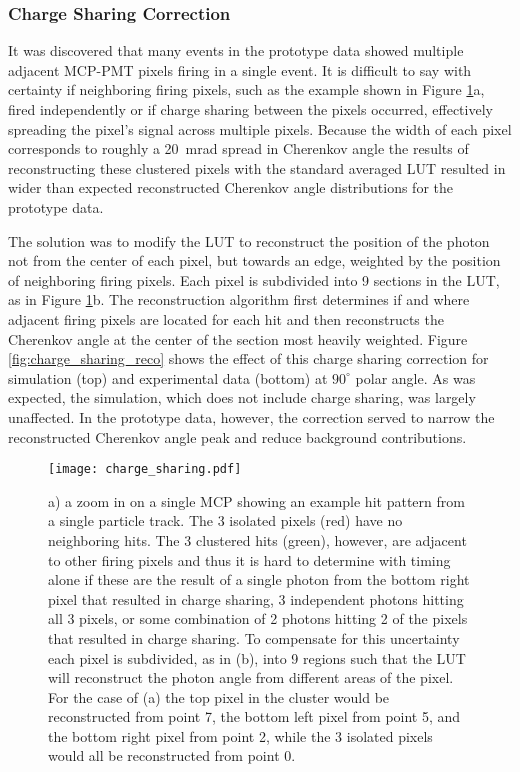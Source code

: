 \subsubsection{Charge Sharing Correction}
It was discovered that many events in the prototype data showed multiple adjacent MCP-PMT pixels firing in a single event. It is difficult to say with certainty if neighboring firing pixels, such as the example shown in Figure \ref{fig:charge_sharing}a, fired independently or if charge sharing between the pixels occurred, effectively spreading the pixel's signal across multiple pixels. Because the width of each pixel corresponds to roughly a 20~mrad spread in Cherenkov angle the results of reconstructing these clustered pixels with the standard averaged LUT resulted in wider than expected reconstructed Cherenkov angle distributions for the prototype data. 

The solution was to modify the LUT to reconstruct the position of the photon not from the center of each pixel, but towards an edge, weighted by the position of neighboring firing pixels. Each pixel is subdivided into 9 sections in the LUT, as in Figure \ref{fig:charge_sharing}b. The reconstruction algorithm first determines if and where adjacent firing pixels are located for each hit and then reconstructs the Cherenkov angle at the center of the section most heavily weighted. Figure \ref{fig:charge_sharing_reco} shows the effect of this charge sharing correction for simulation (top) and experimental data (bottom) at $90^\circ$ polar angle. As was expected, the simulation, which does not include charge sharing, was largely unaffected. In the prototype data, however, the correction served to narrow the reconstructed Cherenkov angle peak and reduce background contributions.

\begin{figure}[!htb]
	\centering
	\texttt{[image: charge\_sharing.pdf]}
	\caption{a) a zoom in on a single MCP showing an example hit pattern from a single particle track. The 3 isolated pixels (red) have no neighboring hits. The 3 clustered hits (green), however, are adjacent to other firing pixels and thus it is hard to determine with timing alone if these are the result of a single photon from the bottom right pixel that resulted in charge sharing, 3 independent photons hitting all 3 pixels, or some combination of 2 photons hitting 2 of the pixels that resulted in charge sharing. To compensate for this uncertainty each pixel is subdivided, as in (b), into 9 regions such that the LUT will reconstruct the photon angle from different areas of the pixel. For the case of (a) the top pixel in the cluster would be reconstructed from point 7, the bottom left pixel from point 5, and the bottom right pixel from point 2, while the 3 isolated pixels would all be reconstructed from point 0.}
	\label{fig:charge_sharing}
\end{figure}

